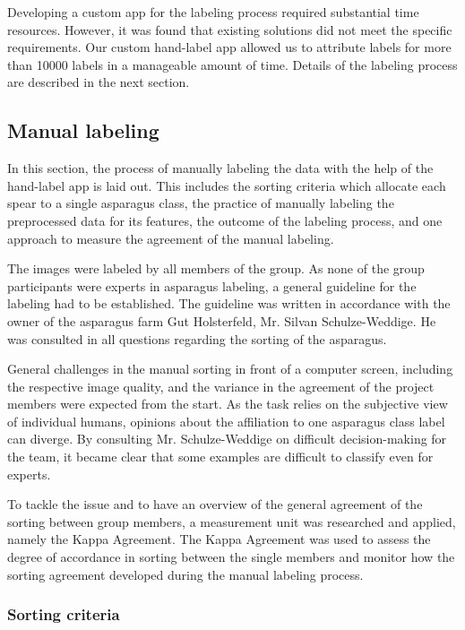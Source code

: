Developing a custom app for the labeling process required substantial time resources. However, it was found that existing solutions did not meet the specific requirements. Our custom hand-label app allowed us to attribute labels for more than 10000 labels in a manageable amount of time. Details of the labeling process are described in the next section.

\newpage

\subsection{Manual labeling}
\label{sec:ManualLabeling}

In this section, the process of manually labeling the data with the help of the hand-label app is laid out. This includes the sorting criteria which allocate each spear to a single asparagus class, the practice of manually labeling the preprocessed data for its features, the outcome of the labeling process, and one approach to measure the agreement of the manual labeling.

\bigskip
The images were labeled by all members of the group. As none of the group participants were experts in asparagus labeling, a general guideline for the labeling had to be established. The guideline was written in accordance with the owner of the asparagus farm Gut Holsterfeld, Mr. Silvan Schulze-Weddige. He was consulted in all questions regarding the sorting of the asparagus. 

General challenges in the manual sorting in front of a computer screen, including the respective image quality, and the variance in the agreement of the project members were expected from the start. As the task relies on the subjective view of individual humans, opinions about the affiliation to one asparagus class label can diverge. By consulting Mr. Schulze-Weddige on difficult decision-making for the team, it became clear that some examples are difficult to classify even for experts. 

To tackle the issue and to have an overview of the general agreement of the sorting between group members, a measurement unit was researched and applied, namely the Kappa Agreement. The Kappa Agreement was used to assess the degree of accordance in sorting between the single members and monitor how the sorting agreement developed during the manual labeling process. 


\subsubsection{Sorting criteria}
\label{subsec:SortingCriteria}

